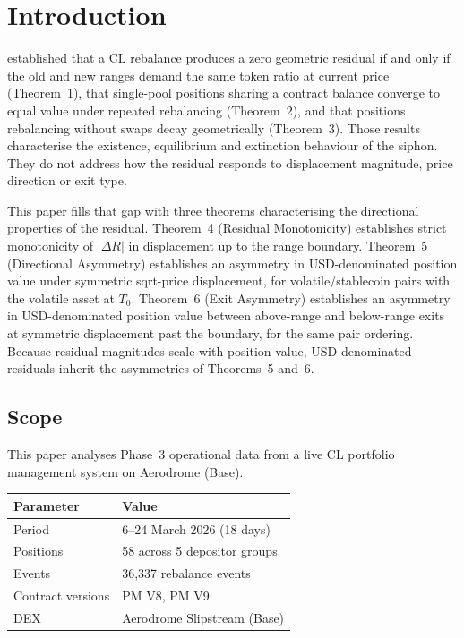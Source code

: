 \documentclass[11pt,a4paper]{article}
\theoremstyle{definition}
\begin{document}
\section{Introduction}

\citet{ryan2026a} established that a CL rebalance produces a zero geometric residual if and only if the old and new ranges demand the same token ratio at current price (Theorem~1), that single-pool positions sharing a contract balance converge to equal value under repeated rebalancing (Theorem~2), and that positions rebalancing without swaps decay geometrically (Theorem~3). Those results characterise the existence, equilibrium and extinction behaviour of the siphon. They do not address how the residual responds to displacement magnitude, price direction or exit type.

This paper fills that gap with three theorems characterising the directional properties of the residual. Theorem~4 (Residual Monotonicity) establishes strict monotonicity of $|\Delta R|$ in displacement up to the range boundary. Theorem~5 (Directional Asymmetry) establishes an asymmetry in USD-denominated position value under symmetric sqrt-price displacement, for volatile/stablecoin pairs with the volatile asset at $T_0$. Theorem~6 (Exit Asymmetry) establishes an asymmetry in USD-denominated position value between above-range and below-range exits at symmetric displacement past the boundary, for the same pair ordering. Because residual magnitudes scale with position value, USD-denominated residuals inherit the asymmetries of Theorems~5 and~6.

\subsection{Scope}

This paper analyses Phase~3 operational data from a live CL portfolio management system on Aerodrome (Base).

\begin{table}[H]
\centering
\begin{tabular}{@{}ll@{}}
\toprule
Parameter & Value \\
\midrule
Period & 6–24 March 2026 (18 days) \\
Positions & 58 across 5 depositor groups \\
Events & 36,337 rebalance events \\
Contract versions & PM V8, PM V9 \\
DEX & Aerodrome Slipstream (Base) \\
\bottomrule
\end{tabular}
\end{table}
\end{document}
